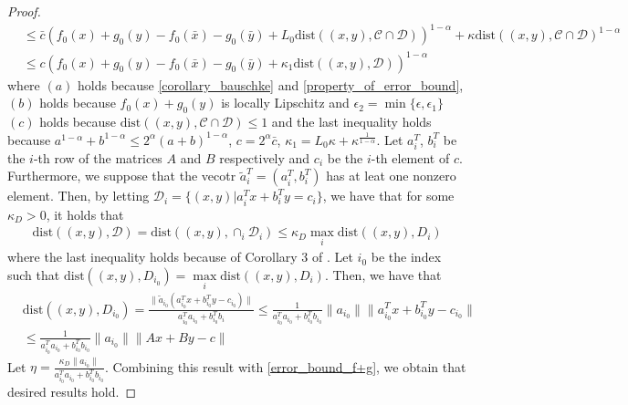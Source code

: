 \documentclass{article}
\numberwithin{equation}{section}
\begin{document}
\begin{proof}
\begin{align}
            & \overset{\mathop{(c)}}{\leq} \bar{c}(f_0(x)+g_0(y)-f_0(\bar{x})-g_0(\bar{y})+L_0\mathrm{dist}((x,y), \mathcal{C}\cap\mathcal{D}))^{1-\alpha}
            + \kappa \mathrm{dist}((x,y),\mathcal{C}\cap \mathcal{D})^{1-\alpha} \nonumber \\
            &\leq c(f_0(x)+g_0(y)-f_0(\bar{x})-g_0(\bar{y})+ \kappa_1\mathrm{dist}((x,y),\mathcal{D}))^{1-\alpha}
            \label{error_bound_f+g}
        \end{align} 
        where $(a)$ holds because \eqref{corollary_bauschke} and \eqref{property_of_error_bound}, $(b)$ holds because $f_0(x)+g_0(y)$ is locally Lipschitz and $\epsilon_2 = \min\{\epsilon, \epsilon_1\}$ 
        $(c)$ holds because $\mathrm{dist}((x,y),\mathcal{C}\cap \mathcal{D}) \leq 1$ and the last inequality holds because 
        $a^{1-\alpha}+ b^{1-\alpha} \leq 2^{\alpha} (a+b)^{1-\alpha}$, $c = 2^{\alpha}\bar{c}$, $\kappa_1 = L_0\kappa+\kappa^{\frac{1}{1-\alpha}}$. 
        Let $a_i^T$, $b_i^T$ be the $i$-th row of the matrices $A$ and $B$ respectively and $c_i$ be the $i$-th element of 
        $c$. Furthermore, we suppose that 
        the vecotr $\tilde{a}_i^T = (a_i^T,b_i^T)$ has at leat one nonzero element.
        Then, by letting $\mathcal{D}_i =\{(x,y)| a_i^Tx+b_i^Ty  =c_i\}$, we have that for some $\kappa_D>0$, 
        it holds that
        \begin{align}
            \mathrm{dist}((x,y), \mathcal{D}) = \mathrm{dist}((x,y),\cap_i\mathcal{D}_i) 
            \leq \kappa_D \max_i \mathrm{dist}((x,y),D_i)  \nonumber
        \end{align}
        where the last inequality holds because of Corollary 3 of \cite{bauschke1999strong}. Let $i_0$ be the 
        index such that $\mathrm{dist}((x,y),D_{i_0}) = \max\limits_i \mathrm{dist}((x,y),D_i)$. Then, we have that
        \begin{align}
            &\mathrm{dist}((x,y),D_{i_0})=\frac{\|\tilde{a}_{i_0}(a_{i_0}^Tx+b_{i_0}^Ty-c_{i_0})\rVert}{a_{i_0}^Ta_{i_0}+b_{i_0}^Tb_i}
            \leq \frac{1}{a_{i_0}^Ta_{i_0}+b_{i_0}^Tb_{i_0}} \|a_{i_0}\rVert \|a_{i_0}^Tx +b_{i_0}^Ty- c_{i_0}\rVert \nonumber \\
            & \leq \frac{1}{a_{i_0}^Ta_{i_0}+b_{i_0}^Tb_{i_0}} \|a_{i_0}\rVert \|Ax+By-c\rVert
        \end{align}
        Let $\eta = \frac{\kappa_D\|a_{i_0}\rVert}{a_{i_0}^Ta_{i_0}+b_{i_0}^Tb_{i_0}}$. 
        Combining this result with \eqref{error_bound_f+g}, we obtain that desired results hold. 
    \end{proof}
\end{document}
